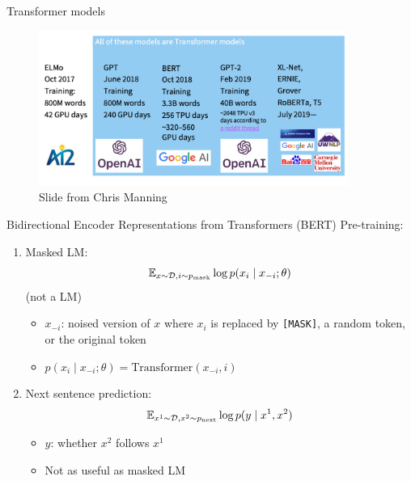 \documentclass[usenames,dvipsnames,11pt,aspectratio=169]{beamer}
\begin{document}
\begin{frame}
    {Transformer models}
    \begin{figure}
        \includegraphics[width=0.9\textwidth]{figures/transformers}
        \caption{Slide from Chris Manning}
    \end{figure}
\end{frame}

\begin{frame}
    {Bidirectional Encoder Representations from Transformers (BERT)}
    Pre-training:\\
    \begin{enumerate}
        \item Masked LM: $$\mathbb{E}_{x\sim\mathcal{D}, i\sim p_{\text{mask}}} \log p(x_i\mid x_{-i}; \theta)$$ (not a LM)
            \begin{itemize}
                \item $x_{-i}$: noised version of $x$ where $x_i$ is replaced by \texttt{[MASK]}, a random token, or the original token
                \item $p(x_i\mid x_{-i}; \theta) = \text{Transformer}(x_{-i}, i)$
            \end{itemize}
        \item Next sentence prediction:
            $$
            \mathbb{E}_{x^1 \sim\mathcal{D}, x^2\sim p_{\text{next}}} \log p(y\mid x^1, x^2)
            $$
            \begin{itemize}
                \item $y$: whether $x^2$ follows $x^1$
                \item Not as useful as masked LM
            \end{itemize}
    \end{enumerate}
\end{frame}
\end{document}
